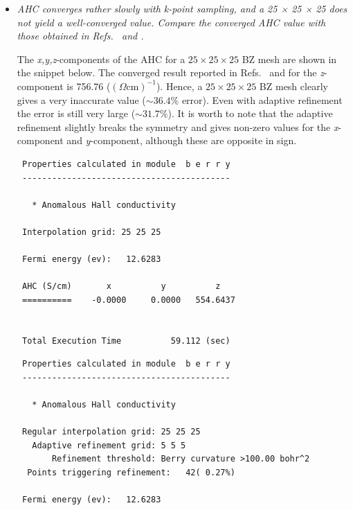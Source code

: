 \begin{itemize}
	\item {\it AHC converges rather slowly with k-point sampling, and a 25 × 25 × 25 does not yield a well-converged value.
	Compare the converged AHC value with those obtained in Refs.~ and .}

	The {\it x,y,z}-components of the AHC for a $25\times25\times25$ BZ mesh are shown in the snippet below. The converged result reported in Refs.~ and  for the \textit{z}-component is 756.76 ($(\Omega \mathrm{cm})^{-1}$). Hence, a $25\times25\times25$ BZ mesh clearly gives a very inaccurate value ($\sim 36.4\%$ error). Even with adaptive refinement the error is still very large ($\sim 31.7\%$). It is worth to note that the adaptive refinement slightly breaks the symmetry and gives non-zero values for the \textit{x}-component and \textit{y}-component, although these are opposite in sign.  

\begin{tcolorbox}[title=Without adaptive refinement,sharp corners,boxrule=0.5pt]
{\small
\begin{verbatim}
 Properties calculated in module  b e r r y
 ------------------------------------------

   * Anomalous Hall conductivity
  
 Interpolation grid: 25 25 25

 Fermi energy (ev):   12.6283

 AHC (S/cm)       x          y          z
 ==========    -0.0000     0.0000   554.6437


 Total Execution Time          59.112 (sec)

\end{verbatim}
}
\end{tcolorbox}

\begin{tcolorbox}[title=With adaptive refinement,sharp corners,boxrule=0.5pt]
{\small
\begin{verbatim}
 Properties calculated in module  b e r r y
 ------------------------------------------

   * Anomalous Hall conductivity
  
 Regular interpolation grid: 25 25 25
   Adaptive refinement grid: 5 5 5
       Refinement threshold: Berry curvature >100.00 bohr^2
  Points triggering refinement:   42( 0.27%)

 Fermi energy (ev):   12.6283


\end{verbatim}}
\end{tcolorbox}
\end{itemize}
